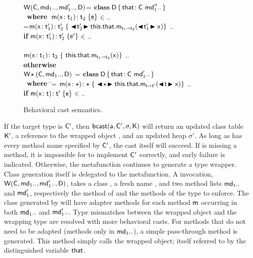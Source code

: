\documentclass[a4paper,USenglish]{lipics-v2018}
\newcommand{\bscast}[2]{\EM{\BehCast{#1}{{#2}}}}
\newcommand{\WHERE}{~\EM{\xt{\bf where}}~}
\newcommand{\HS}{\hspace{.2cm}}
\newcommand{\EM}[1]{\ensuremath{#1}\xspace}
\newcommand{\xt}[1]{{\sf{#1}}}
\newcommand{\bt}[1]{\xt{\bf #1}}
\newcommand{\EMxt}[1]{\EM{\xt{#1}}}
\newcommand{\x}{\EMxt x}
\newcommand{\m}{\EMxt m}
\newcommand{\s}{\EM{\sigma}}
\newcommand{\K}{\EMxt K}
\newcommand{\Kp}{{\EMxt{K'}}}
\renewcommand{\sp}{{{\EM{\s'}}}}
\newcommand{\Cp}{\EMxt{C'}}
\newcommand{\any}{\EM{\star}}
\newcommand{\this}{\EMxt{this}}
\newcommand{\that}{\EMxt{that}}
\newcommand{\FRead}[1]{\EM{\this.#1}}
\newcommand{\KCall}[5]{\EM{{#1}.{#2}_{{#4} \shortrightarrow {#5}}(#3)}}
\newcommand{\BehStart}{\EM{\blacktriangleleft}}
\newcommand{\BehEnd}{\EM{\blacktriangleright}}
\newcommand{\BehCast}[2]{\EM{\BehStart\! #1\! \BehEnd #2}}
\newcommand{\HT}[2]{\EM{{#1}\!:{#2}}}
\newcommand{\Mdef}[5]{\EM{ \HT{ #1( \HT{#2}{#3})}{#4}\;\{{#5}\}}}
\newcommand{\behcastS}[4]{\EM{\xt{bcast}(#1, #2, #3, #4)}}
\newcommand{\Class}[3]{\EM{\bt{class}\;#1\,\{\,#2~#3\,\}}}
\newcommand{\Fdef}[2]{\EM{ \HT{#1}{#2} }}
\newcommand{\wrap}[4]{\EM{\xt{W}(#1,#2,#3,#4)}}
\newcommand{\wrapAny}[3]{\EM{\xt{W}\!\any(#1,#2,#3)}}
\newcommand{\In}{\EM{\in}}
\newcommand{\src}[1]{\colorbox[gray]{0.89}{$#1$}}
\newcounter{lem}
\newcommand{\W}{\xt{W}\xspace}
\begin{document}
\begin{figure}[t]
\hspace{8mm}\begin{minipage}{12cm}\begin{tabbing}\small
\wrap\C{\md[1]..}{\mdp[1]..}\D = \src{\Class\D{\Fdef\that\C}{\mdpp[1]..}}\\
\HS\HS\WHERE\HS\= \Mdef\m\x{\t[1]}{\t[2]}\e\In\md[1].. \\
\> \mdpp[1] =\= \src{\Mdef\m\x{\tp[1]}{\tp[2]}{~\BehCast{\tp[2]}{\KCall{\FRead\that}\m{\bscast{\tp[1]}\x}{\t[1]}{\t[2]}}}} .. \\
\> \> \HS\HS \= \textbf{if} \HS \Mdef\m\x{\tp[1]}{\tp[2]}\ep\In\mdp[1].. \\
\\[-3mm]
\> \> \src{\Mdef\m\x{\t[1]}{\t[2]}{~\KCall{\FRead\that}\m{\x}{\t[1]}{\t[2]}}} .. \\ \> \> \HS\HS \textbf{otherwise}
\\[2mm]
\wrapAny{\C}{\md[1]..}{\D} = \src{\Class \D{ \Fdef\that\C}{ \mdp[1]..}}\\
\HS\HS\WHERE\HS\=\mdp[1] = \src{ \Mdef\m\x{\any}{\any}{~\BehCast\any{ \KCall{\FRead\that} \m {\bscast{\t}\x}{\t}{\tp}} } } ..
\HS\HS\HS\HS \\ \> \> \HS\HS \= \textbf{if} \HS \Mdef\m\x{\t}{\tp}\e\In\md[1].. \\
\end{tabbing}\end{minipage}

\vspace{-2mm}

\hrulefill
\caption{Behavioral cast semantics.}\label{behavetext}
\end{figure}

If the target type is \Cp, then \behcastS\a\Cp\s\K will return an updated
class table \Kp, a reference to the wrapped object \ap, and an updated heap
\sp. As long as \a has every method name specified by \Cp, the cast itself
will succeed. If \a is missing a method, it is impossible for \a to
implement \Cp correctly, and early failure is indicated. Otherwise, the
metafunction continues to generate a type wrapper. Class generation itself
is delegated to the \W metafunction. A \W invocation,
\EM{\W(\C,\md_1..,\mdp_1.., \D)}, takes a class \C, a fresh name \D, and two
method lists $\md_1..$ and $\mdp_1$, respectively the method of \C and the
methods of the type to enforce. The class generated by \W will have adapter
methods for each method \m occurring in both $\md_1..$ and $\mdp_1..$. Type
mismatches between the wrapped object and the wrapping type are resolved
with more behavioral casts. For methods that do not need to be adapted
(methods only in $\md_1..$), a simple pass-through method is generated. This
method simply calls the wrapped object; itself referred to by the
distinguished variable \that.
\end{document}
